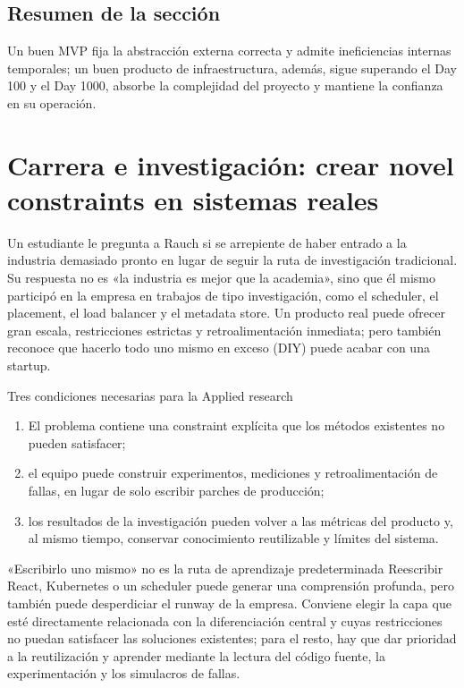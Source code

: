 \documentclass[a4paper]{article}
\begin{document}
\subsection{Resumen de la sección}

Un buen MVP fija la abstracción externa correcta y admite ineficiencias internas temporales; un buen producto de infraestructura, además, sigue superando el Day 100 y el Day 1000, absorbe la complejidad del proyecto y mantiene la confianza en su operación.
\section{Carrera e investigación: crear novel constraints en sistemas reales}

Un estudiante le pregunta a Rauch si se arrepiente de haber entrado a la industria demasiado pronto en lugar de seguir la ruta de investigación tradicional. Su respuesta no es «la industria es mejor que la academia», sino que él mismo participó en la empresa en trabajos de tipo investigación, como el scheduler, el placement, el load balancer y el metadata store. Un producto real puede ofrecer gran escala, restricciones estrictas y retroalimentación inmediata; pero también reconoce que hacerlo todo uno mismo en exceso (DIY) puede acabar con una startup.

\begin{knowledgebox}{Tres condiciones necesarias para la Applied research}
\begin{enumerate}
  \item El problema contiene una constraint explícita que los métodos existentes no pueden satisfacer;
  \item el equipo puede construir experimentos, mediciones y retroalimentación de fallas, en lugar de solo escribir parches de producción;
  \item los resultados de la investigación pueden volver a las métricas del producto y, al mismo tiempo, conservar conocimiento reutilizable y límites del sistema.
\end{enumerate}
\end{knowledgebox}

\begin{warningbox}{«Escribirlo uno mismo» no es la ruta de aprendizaje predeterminada}
Reescribir React, Kubernetes o un scheduler puede generar una comprensión profunda, pero también puede desperdiciar el runway de la empresa. Conviene elegir la capa que esté directamente relacionada con la diferenciación central y cuyas restricciones no puedan satisfacer las soluciones existentes; para el resto, hay que dar prioridad a la reutilización y aprender mediante la lectura del código fuente, la experimentación y los simulacros de fallas.
\end{warningbox}
\end{document}
